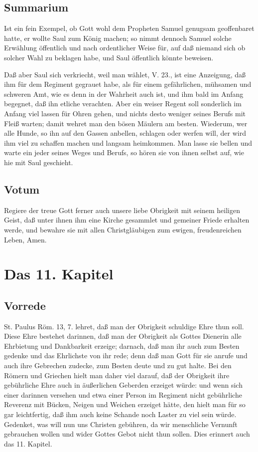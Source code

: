 \section{Summarium}

Ist ein fein Exempel, ob Gott wohl dem Propheten Samuel genugsam geoffenbaret hatte, er wollte Saul zum König machen; so nimmt dennoch Samuel solche Erwählung öffentlich und nach ordentlicher Weise für, auf daß niemand sich ob solcher Wahl zu beklagen habe, und Saul öffentlich könnte beweisen.

Daß aber Saul sich verkriecht, weil man wählet, V. 23., ist eine Anzeigung, daß ihm für dem Regiment gegrauet habe, als für einem gefährlichen, mühsamen und schweren Amt, wie es denn in der Wahrheit auch ist, und ihm bald im Anfang begegnet, daß ihn etliche verachten. Aber ein weiser Regent soll sonderlich im Anfang viel
lassen für Ohren gehen, und nichts desto weniger seines Berufs mit Fleiß warten; damit wehret man den bösen Mäulern am besten. Wiederum, wer alle Hunde, so ihn auf den Gassen anbellen, schlagen oder werfen will, der wird ihm viel zu schaffen machen und langsam heimkommen. Man lasse sie bellen und warte ein jeder seines Weges und Berufs, so hören sie von ihnen selbst auf, wie hie mit Saul geschieht.

\section{Votum}

Regiere der treue Gott ferner auch unsere liebe Obrigkeit mit seinem heiligen Geist, daß unter ihnen ihm eine Kirche gesammlet und gemeiner Friede erhalten werde, und bewahre sie mit allen Christgläubigen zum ewigen, freudenreichen Leben, Amen.

\chapter{Das 11. Kapitel}

\section{Vorrede}

St. Paulus Röm. 13, 7. lehret, daß man der Obrigkeit schuldige Ehre thun soll. Diese Ehre bestehet darinnen, daß man der Obrigkeit als Gottes Dienerin alle Ehrbietung und Dankbarkeit erzeige; darnach, daß man ihr auch zum Besten gedenke und das Ehrlichste von ihr rede; denn daß man Gott für sie anrufe und auch ihre Gebrechen zudecke, zum Besten deute und zu gut halte. Bei den Römern und Griechen hielt man daher viel darauf, daß der Obrigkeit ihre gebührliche Ehre auch in äußerlichen Geberden erzeiget würde: und wenn sich einer darinnen versehen und etwa einer Person im Regiment nicht gebührliche Reverenz mit Bücken, Neigen und Weichen erzeiget hätte, den hielt man für so gar leichtfertig, daß ihm auch keine Schande noch Laster zu viel sein würde. Gedenket, was will nun uns Christen gebühren, da wir menschliche Vernunft gebrauchen wollen und wider Gottes Gebot nicht thun sollen. Dies erinnert auch das 11. Kapitel.

